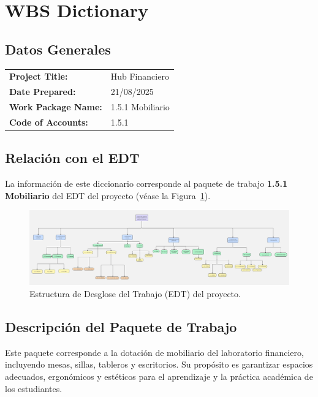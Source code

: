 \section{WBS Dictionary}

\subsection{Datos Generales}

\begin{tabularx}{\textwidth}{@{}lX@{}}
\textbf{Project Title:} & Hub Financiero \\
\textbf{Date Prepared:} & 21/08/2025 \\
\textbf{Work Package Name:} & 1.5.1 Mobiliario \\
\textbf{Code of Accounts:} & 1.5.1 \\
\end{tabularx}

\subsection{Relación con el EDT}

La información de este diccionario corresponde al paquete de trabajo \textbf{1.5.1 Mobiliario} del EDT del proyecto (véase la Figura~\ref{fig:edt}).

\begin{figure}[H]
  \centering
  \includegraphics[width=\textwidth]{Figures/0. General/EDT.jpg}
  \caption{Estructura de Desglose del Trabajo (EDT) del proyecto.}
  \label{fig:edt}
\end{figure}

\subsection{Descripción del Paquete de Trabajo}

Este paquete corresponde a la dotación de mobiliario del laboratorio financiero, incluyendo mesas, sillas, tableros y escritorios. Su propósito es garantizar espacios adecuados, ergonómicos y estéticos para el aprendizaje y la práctica académica de los estudiantes.

